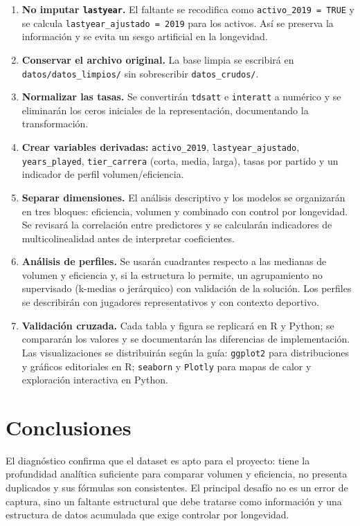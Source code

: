 \documentclass[11pt,a4paper]{article}
\begin{document}
\begin{enumerate}
  \item \textbf{No imputar \texttt{lastyear}.} El faltante se recodifica como \texttt{activo\_2019 = TRUE} y se calcula \texttt{lastyear\_ajustado = 2019} para los activos. Así se preserva la información y se evita un sesgo artificial en la longevidad.
  \item \textbf{Conservar el archivo original.} La base limpia se escribirá en \texttt{datos/datos\_limpios/} sin sobrescribir \texttt{datos\_crudos/}.
  \item \textbf{Normalizar las tasas.} Se convertirán \texttt{tdsatt} e \texttt{interatt} a numérico y se eliminarán los ceros iniciales de la representación, documentando la transformación.
  \item \textbf{Crear variables derivadas:} \texttt{activo\_2019}, \texttt{lastyear\_ajustado}, \texttt{years\_played}, \texttt{tier\_carrera} (corta, media, larga), tasas por partido y un indicador de perfil volumen/eficiencia.
  \item \textbf{Separar dimensiones.} El análisis descriptivo y los modelos se organizarán en tres bloques: eficiencia, volumen y combinado con control por longevidad. Se revisará la correlación entre predictores y se calcularán indicadores de multicolinealidad antes de interpretar coeficientes.
  \item \textbf{Análisis de perfiles.} Se usarán cuadrantes respecto a las medianas de volumen y eficiencia y, si la estructura lo permite, un agrupamiento no supervisado (k-medias o jerárquico) con validación de la solución. Los perfiles se describirán con jugadores representativos y con contexto deportivo.
  \item \textbf{Validación cruzada.} Cada tabla y figura se replicará en R y Python; se compararán los valores y se documentarán las diferencias de implementación. Las visualizaciones se distribuirán según la guía: \texttt{ggplot2} para distribuciones y gráficos editoriales en R; \texttt{seaborn} y \texttt{Plotly} para mapas de calor y exploración interactiva en Python.
\end{enumerate}

\section{Conclusiones}
El diagnóstico confirma que el dataset es apto para el proyecto: tiene la profundidad analítica suficiente para comparar volumen y eficiencia, no presenta duplicados y sus fórmulas son consistentes. El principal desafío no es un error de captura, sino un faltante estructural que debe tratarse como información y una estructura de datos acumulada que exige controlar por longevidad.
\end{document}
